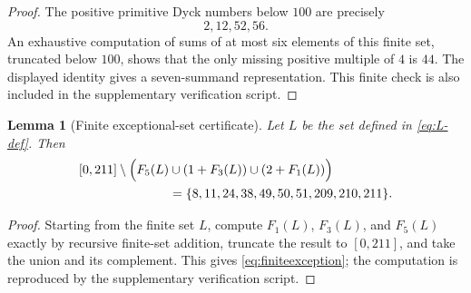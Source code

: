 \documentclass[12pt]{article}
\theoremstyle{plain}
\newtheorem{lemma}[theorem]{Lemma}
\theoremstyle{definition}
\theoremstyle{plain}
\begin{document}
\begin{proof}
The positive primitive Dyck numbers below $100$ are precisely
\[
 2,12,52,56.
\]
An exhaustive computation of sums of at most six elements of this finite
set, truncated below $100$, shows that the only missing positive multiple
of $4$ is $44$.  The displayed identity gives a seven-summand
representation.  This finite check is also included in the supplementary
verification script.
\end{proof}

\begin{lemma}[Finite exceptional-set certificate]\label{lem:finiteexception}
Let $L$ be the set defined in \eqref{eq:L-def}.  Then
\begin{equation}\label{eq:finiteexception}
\begin{split}
 [0,211]\setminus\Bigl(
 F_5(L)&\cup(1+F_3(L))\cup(2+F_1(L))\Bigr)\\
 &=\{8,11,24,38,49,50,51,209,210,211\}.
\end{split}
\end{equation}
\end{lemma}

\begin{proof}
Starting from the finite set $L$, compute $F_1(L)$, $F_3(L)$, and
$F_5(L)$ exactly by recursive finite-set addition, truncate the result to
$[0,211]$, and take the union and its complement.  This gives
\eqref{eq:finiteexception}; the computation is reproduced by the
supplementary verification script.
\end{proof}
\end{document}
